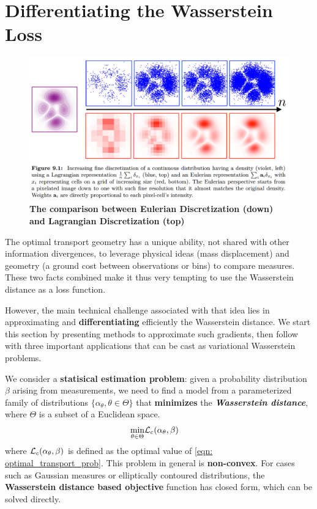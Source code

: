 \documentclass[11pt]{article}
\begin{document}
\section{Differentiating the Wasserstein Loss}
\begin{figure}
\begin{minipage}[t]{1\linewidth}
  \centering
  \centerline{\includegraphics[scale = 0.3]{eulerian_lagrangian_comp.png}}
\end{minipage}
\caption{\footnotesize{\textbf{The comparison between Eulerian Discretization (down) and Lagrangian Discretization (top) \citep{gabriel2019computational} }}}
\label{fig: eulerian_lagrangian_comp}
\end{figure}
The optimal transport geometry has a unique ability, not shared with other information divergences, to leverage physical ideas (mass displacement) and geometry (a ground
cost between observations or bins) to compare measures. These two facts combined make it thus very tempting to use the Wasserstein distance as a loss function.  

However, the main technical challenge associated with that idea lies in approximating and \textbf{differentiating} efficiently the Wasserstein distance.  We start this section by presenting methods to approximate such gradients, then follow with three important applications that can be cast as variational Wasserstein problems.

We consider a \textbf{statisical estimation problem}: given a probability distribution $\beta$ arising from measurements, we need to find a model from a parameterized family of distributions $\{\alpha_{\theta}, \theta \in \Theta\}$ that \textbf{minimizes} the \emph{\textbf{Wasserstein distance}}, where $\Theta$ is a subset of a Euclidean space.
\begin{align}
\min_{\theta \in \Theta} & {\mathcal L}_{c}(\alpha_{\theta}, \beta) \label{eqn: stats_estimation_ot}
\end{align} where ${\mathcal L}_{c}(\alpha_{\theta}, \beta)$ is defined as the optimal value of \eqref{eqn: optimal_transport_prob}. This problem in general is \textbf{non-convex}. For cases such as Gaussian measures or elliptically contoured distributions, the \textbf{Wasserstein distance based objective} function has closed form, which can be solved directly. 
\end{document}
